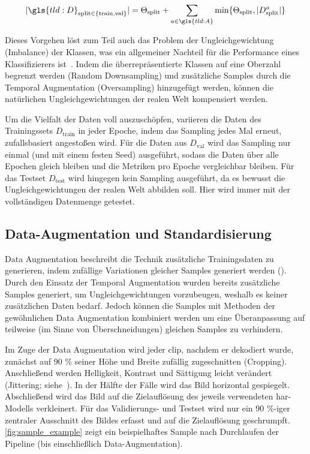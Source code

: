 \begin{equation}
    \label{eq:limit}
    | \gls{tld:D}_{\text{split} \in \{\text{train}, \text{val}\}} | = \Theta_\text{split} + \sum\limits_{a \in \gls{tld:A}} \min \{ \Theta_\text{split}, |D^a_\text{split}| \}
\end{equation}

Dieses Vorgehen löst zum Teil auch das Problem der Ungleichgewichtung (Imbalance) der Klassen, was ein allgemeiner Nachteil für die Performance eines Klassifizierers ist~\cite{Giancola18, Burkov19}.
Indem die überrepräsentierte Klassen auf eine Oberzahl begrenzt werden (Random Downsampling) und zusätzliche Samples durch die Temporal Augmentation (Oversampling) hinzugefügt werden, können die natürlichen Ungleichgewichtungen der realen Welt kompensiert werden.

Um die Vielfalt der Daten voll auszuschöpfen, variieren die Daten des Trainingssets $D_{\text{train}}$ in jeder Epoche, indem das Sampling jedes Mal erneut, zufallsbasiert angestoßen wird.
Für die Daten aus $D_\text{val}$ wird das Sampling nur einmal (und mit einem festen Seed) ausgeführt, sodass die Daten über alle Epochen gleich bleiben und die Metriken pro Epoche vergleichbar bleiben.
Für das Testset $D_\text{test}$ wird hingegen kein Sampling ausgeführt, da es bewusst die Ungleichgewichtungen der realen Welt abbilden soll.
Hier wird immer mit der vollständigen Datenmenge getestet.

\subsection{Data-Augmentation und Standardisierung}
\label{subsec:data-augmentation}

Data Augmentation beschreibt die Technik zusätzliche Trainingsdaten zu generieren, indem zufällige Variationen gleicher Samples generiert werden (\cite{Gugger20}).
Durch den Einsatz der Temporal Augmentation wurden bereits zusätzliche Samples generiert, um Ungleichgewichtungen vorzubeugen, weshalb es keiner zusätzlichen Daten bedarf.
Jedoch können die Samples mit Methoden der gewöhnlichen Data Augmentation kombiniert werden um eine Überanpassung auf teilweise (im Sinne von Überschneidungen) gleichen Samples zu verhindern.

Im Zuge der Data Augmentation wird jeder \gls{clip}, nachdem er dekodiert wurde, zunächst auf 90 \% seiner Höhe und Breite zufällig zugeschnitten (Cropping).
Anschließend werden Helligkeit, Kontrast und Sättigung leicht verändert (Jittering; siehe~\cite{Tran18}).
In der Hälfte der Fälle wird das Bild horizontal gespiegelt.
Abschließend wird das Bild auf die Zielauflösung des jeweils verwendeten \gls{har}-Modells verkleinert.
Für das Validierungs- und Testset wird nur ein 90 \%-iger zentraler Ausschnitt des Bildes erfasst und auf die Zielauflösung geschrumpft.
\autoref{fig:sample_example} zeigt ein beispielhaftes Sample nach Durchlaufen der Pipeline (bis einschließlich Data-Augmentation).

